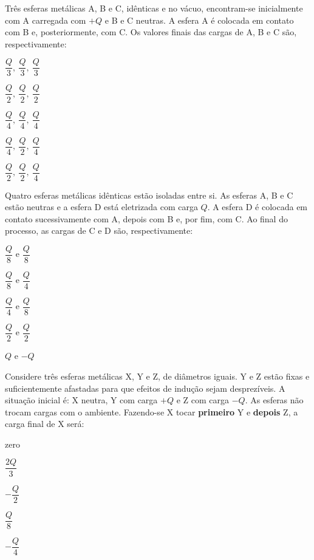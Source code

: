\blocoaprofundamento
\begin{questao}[3]{}

Três esferas metálicas A, B e C, idênticas e no vácuo, encontram-se inicialmente
com A carregada com $+Q$ e B e C neutras. A esfera A é colocada em contato com B
e, posteriormente, com C. Os valores finais das cargas de A, B e C são,
respectivamente:
\begin{alternativas}[2]
\item $\dfrac{Q}{3},\ \dfrac{Q}{3},\ \dfrac{Q}{3}$
\item $\dfrac{Q}{2},\ \dfrac{Q}{2},\ \dfrac{Q}{2}$
\item $\dfrac{Q}{4},\ \dfrac{Q}{4},\ \dfrac{Q}{4}$
\item $\dfrac{Q}{4},\ \dfrac{Q}{2},\ \dfrac{Q}{4}$
\item $\dfrac{Q}{2},\ \dfrac{Q}{2},\ \dfrac{Q}{4}$
\end{alternativas}


\end{questao}
\begin{questao}[3]{}

Quatro esferas metálicas idênticas estão isoladas entre si. As esferas A, B e C
estão neutras e a esfera D está eletrizada com carga $Q$. A esfera D é colocada
em contato sucessivamente com A, depois com B e, por fim, com C.
Ao final do processo, as cargas de C e D são, respectivamente:
\begin{alternativas}[2]
\item $\dfrac{Q}{8}$ e $\dfrac{Q}{8}$
\item $\dfrac{Q}{8}$ e $\dfrac{Q}{4}$
\item $\dfrac{Q}{4}$ e $\dfrac{Q}{8}$
\item $\dfrac{Q}{2}$ e $\dfrac{Q}{2}$
\item $Q$ e $-Q$
\end{alternativas}


\end{questao}
\begin{questao}[3]{}

Considere três esferas metálicas X, Y e Z, de diâmetros iguais. Y e Z estão fixas
e suficientemente afastadas para que efeitos de indução sejam desprezíveis. A
situação inicial é: X neutra, Y com carga $+Q$ e Z com carga $-Q$. As esferas não
trocam cargas com o ambiente. Fazendo-se X tocar \textbf{primeiro} Y e
\textbf{depois} Z, a carga final de X será:
\begin{alternativas}[2]
\item zero
\item $\dfrac{2Q}{3}$
\item $-\dfrac{Q}{2}$
\item $\dfrac{Q}{8}$
\item $-\dfrac{Q}{4}$
\end{alternativas}


\end{questao}
